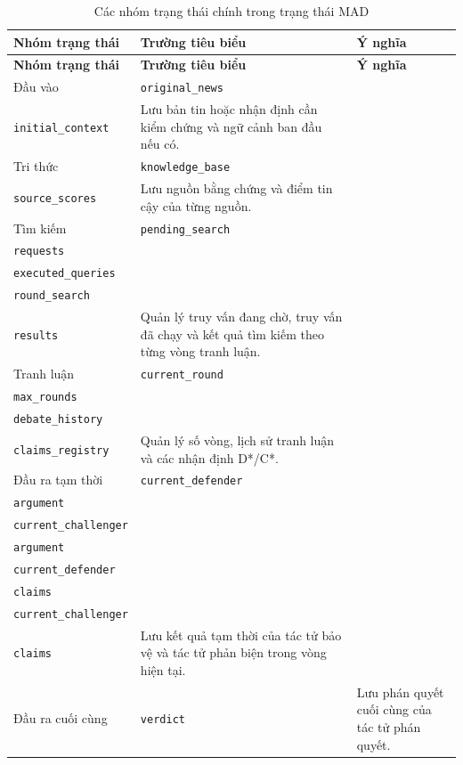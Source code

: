﻿\documentclass[oneside,a4paper,12pt]{extreport}
\begin{document}
\begin{longtable}{|p{3.2cm}|p{4.2cm}|p{6.6cm}|}
\caption{Các nhóm trạng thái chính trong trạng thái MAD}
\label{tab:madstate}\\
\hline
\textbf{Nhóm trạng thái} & \textbf{Trường tiêu biểu} & \textbf{Ý nghĩa} \\
\hline
\endfirsthead
\hline
\textbf{Nhóm trạng thái} & \textbf{Trường tiêu biểu} & \textbf{Ý nghĩa} \\
\hline
\endhead
Đầu vào & \raggedright \small \texttt{original\_news}\\ \texttt{initial\_context} & Lưu bản tin hoặc nhận định cần kiểm chứng và ngữ cảnh ban đầu nếu có. \\
\hline
Tri thức & \raggedright \small \texttt{knowledge\_base}\\ \texttt{source\_scores} & Lưu nguồn bằng chứng và điểm tin cậy của từng nguồn. \\
\hline
Tìm kiếm & \raggedright \small \texttt{pending\_search}\\ \texttt{requests}\\ \texttt{executed\_queries}\\ \texttt{round\_search}\\ \texttt{results} & Quản lý truy vấn đang chờ, truy vấn đã chạy và kết quả tìm kiếm theo từng vòng tranh luận. \\
\hline
Tranh luận & \raggedright \small \texttt{current\_round}\\ \texttt{max\_rounds}\\ \texttt{debate\_history}\\ \texttt{claims\_registry} & Quản lý số vòng, lịch sử tranh luận và các nhận định D*/C*. \\
\hline
Đầu ra tạm thời & \raggedright \small \texttt{current\_defender}\\ \texttt{argument}\\ \texttt{current\_challenger}\\ \texttt{argument}\\ \texttt{current\_defender}\\ \texttt{claims}\\ \texttt{current\_challenger}\\ \texttt{claims} & Lưu kết quả tạm thời của tác tử bảo vệ và tác tử phản biện trong vòng hiện tại. \\
\hline
Đầu ra cuối cùng & \raggedright \small \texttt{verdict} & Lưu phán quyết cuối cùng của tác tử phán quyết. \\
\hline
\end{longtable}
\end{document}

